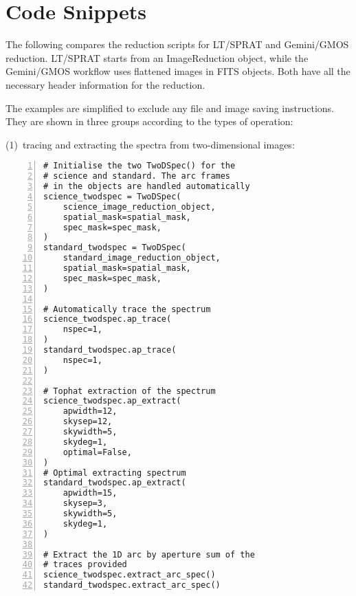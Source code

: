 \section{Code Snippets}

The following compares the reduction scripts for LT/SPRAT and
Gemini/GMOS reduction. LT/SPRAT starts from an ImageReduction object,
while the Gemini/GMOS workflow uses flattened images in FITS objects.
Both have all the necessary header information for the reduction.

The examples are simplified to exclude any file and image saving
instructions. They are shown in three groups according to the types
of operation:

(1)~tracing and extracting the spectra from two-dimensional images:

\vspace*{2em}
\noindent
\begin{minipage}{0.45\linewidth}
\begin{Verbatim}[frame=topline,numbers=left,label=LT/SPRAT,framesep=3mm]
# Initialise the two TwoDSpec() for the
# science and standard. The arc frames
# in the objects are handled automatically
science_twodspec = TwoDSpec(
    science_image_reduction_object,
    spatial_mask=spatial_mask,
    spec_mask=spec_mask,
)
standard_twodspec = TwoDSpec(
    standard_image_reduction_object,
    spatial_mask=spatial_mask,
    spec_mask=spec_mask,
)

# Automatically trace the spectrum
science_twodspec.ap_trace(
    nspec=1,
)
standard_twodspec.ap_trace(
    nspec=1,
)

# Tophat extraction of the spectrum
science_twodspec.ap_extract(
    apwidth=12,
    skysep=12,
    skywidth=5,
    skydeg=1,
    optimal=False,
)
# Optimal extracting spectrum
standard_twodspec.ap_extract(
    apwidth=15,
    skysep=3,
    skywidth=5,
    skydeg=1,
)

# Extract the 1D arc by aperture sum of the
# traces provided
science_twodspec.extract_arc_spec()
standard_twodspec.extract_arc_spec()
\end{Verbatim}
\end{minipage}\hfill

